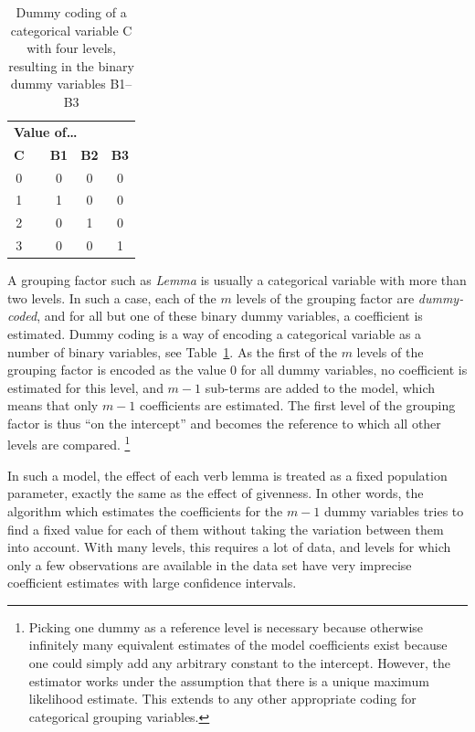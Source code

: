 \begin{table}
  \centering
  \begin{tabular}{cp{2mm}ccc}
    \toprule
    \multicolumn{5}{l}{\textbf{Value of\ldots}} \\
    \textbf{C} && \textbf{B1} & \textbf{B2} & \textbf{B3} \\
    \midrule
    0 && 0 & 0 & 0 \\ 
    1 && 1 & 0 & 0 \\ 
    2 && 0 & 1 & 0 \\ 
    3 && 0 & 0 & 1 \\ 
    \bottomrule
  \end{tabular}
  \caption{Dummy coding of a categorical variable C with four levels, resulting in the binary dummy variables B1--B3}
  \label{tab:dummy}
\end{table}

A grouping factor such as \textit{Lemma} is usually a categorical variable with more than two levels.
In such a case, each of the $m$ levels of the grouping factor are \textit{dummy-coded}, and for all but one of these binary dummy variables, a coefficient is estimated.
Dummy coding is a way of encoding a categorical variable as a number of binary variables, see Table~\ref{tab:dummy}.
As the first of the $m$ levels of the grouping factor is encoded as the value 0 for all dummy variables, no coefficient is estimated for this level, and $m-1$ sub-terms are added to the model, which means that only $m-1$ coefficients are estimated.
The first level of the grouping factor is thus ``on the intercept'' and becomes the reference to which all other levels are compared.%
\footnote{Picking one dummy as a reference level is necessary because otherwise infinitely many equivalent estimates of the model coefficients exist because one could simply add any arbitrary constant to the intercept.
However, the estimator works under the assumption that there is a unique maximum likelihood estimate.
This extends to any other appropriate coding for categorical grouping variables.
}

In such a model, the effect of each verb lemma is treated as a fixed population parameter, exactly the same as the effect of givenness.
In other words, the algorithm which estimates the coefficients for the $m-1$ dummy variables tries to find a fixed value for each of them without taking the variation between them into account.
With many levels, this requires a lot of data, and levels for which only a few observations are available in the data set have very imprecise coefficient estimates with large confidence intervals.

